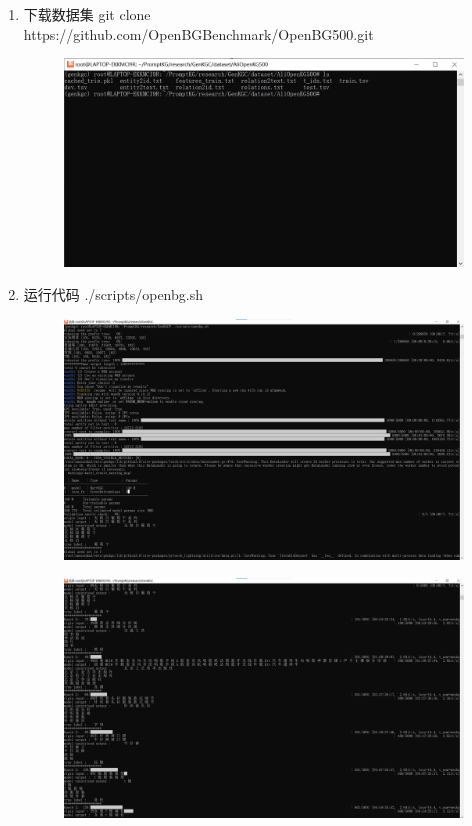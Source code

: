 \documentclass{article}
\begin{document}
\begin{enumerate}
\newpage
    \item 下载数据集 git clone https://github.com/OpenBGBenchmark/OpenBG500.git
\begin{figure}[htp]
        \centering
        \includegraphics[width=16cm]{数据集.png}
        \caption{}
        \label{pic7}
\end{figure}
\newpage

    \item 运行代码 ./scripts/openbg.sh
\begin{figure}[htp]
        \centering
        \includegraphics[width=16cm]{run.png}
        \caption{}
        \label{pic7}
\end{figure}
\begin{figure}[htp]
        \centering
        \includegraphics[width=16cm]{过程.png}
        \caption{}
        \label{pic7}
\end{figure} 
    

\end{enumerate}
\end{document}
